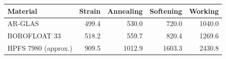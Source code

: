 \begin{tabular}{lrrrr}\toprule Material & Strain & Annealing & Softening & Working \\ \midrule
AR-GLAS & 499.4 & 530.0 & 720.0 & 1040.0 \\
BOROFLOAT 33 & 518.2 & 559.7 & 820.4 & 1269.6 \\
HPFS 7980 (approx.) & 909.5 & 1012.9 & 1603.3 & 2430.8 \\
\bottomrule\end{tabular}
